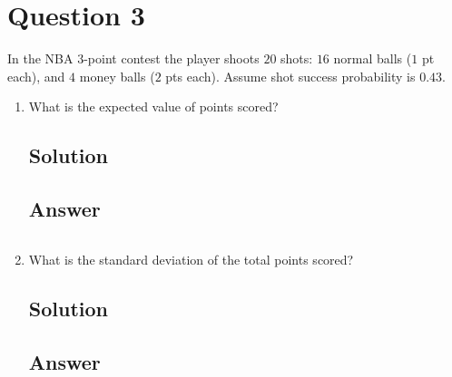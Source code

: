 \documentclass[12pt]{article}
\begin{document}
	
	\section*{Question 3}
	
	\noindent In the NBA $3$-point contest the player shoots $20$ shots: $16$ normal balls ($1$ pt each), and $4$ money balls ($2$ pts each). Assume shot success probability is $0.43$.
	
	\bigskip
	
	\begin{enumerate}[start=1,label={\bfseries Part \arabic*:},leftmargin=0in]
		\bigskip\item What is the expected value of points scored?
		
		\subsection*{Solution}
		
		\subsection*{Answer}
		
			\[\boxed{}\]
		
		\bigskip\item What is the standard deviation of the total points scored?
		
		\subsection*{Solution}
		
		\subsection*{Answer}
		
			\[\boxed{}\]
	\end{enumerate}
	
\end{document}

